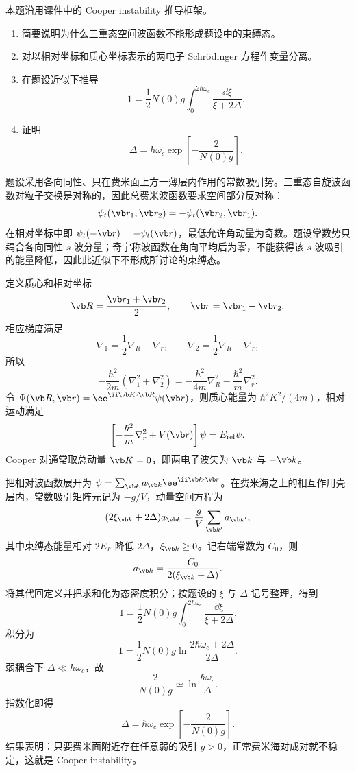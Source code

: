\begin{question}
本题沿用课件中的 Cooper instability 推导框架。
\begin{enumerate}
  \item 简要说明为什么三重态空间波函数不能形成题设中的束缚态。
  \item 对以相对坐标和质心坐标表示的两电子 Schrödinger 方程作变量分离。
  \item 在题设近似下推导
  \[
  1=\frac12N(0)g\int_0^{2\hbar\omega_c}\frac{\dd\xi}{\xi+2\Delta}.
  \]
  \item 证明
  \[
  \Delta=\hbar\omega_c\exp\left[-\frac{2}{N(0)g}\right].
  \]
\end{enumerate}


\begin{solution}
题设采用各向同性、只在费米面上方一薄层内作用的常数吸引势。三重态自旋波函数对粒子交换是对称的，因此总费米波函数要求空间部分反对称：
\[
 \psi_t(\vb r_1,\vb r_2)=-\psi_t(\vb r_2,\vb r_1).
\]
在相对坐标中即 $\psi_t(-\vb r)=-\psi_t(\vb r)$，最低允许角动量为奇数。题设常数势只耦合各向同性 $s$ 波分量；奇宇称波函数在角向平均后为零，不能获得该 $s$ 波吸引的能量降低，因此此近似下不形成所讨论的束缚态。

定义质心和相对坐标
\[
 \vb R=\frac{\vb r_1+\vb r_2}{2},\qquad
 \vb r=\vb r_1-\vb r_2.
\]
相应梯度满足
\[
 \nabla_1=\frac12\nabla_R+\nabla_r,
 \qquad
 \nabla_2=\frac12\nabla_R-\nabla_r,
\]
所以
\[
 -\frac{\hbar^2}{2m}(\nabla_1^2+\nabla_2^2)
 =-\frac{\hbar^2}{4m}\nabla_R^2-
 \frac{\hbar^2}{m}\nabla_r^2.
\]
令
$\Psi(\vb R,\vb r)=\ee^{\ii\vb K\cdot\vb R}\psi(\vb r)$，则质心能量为 $\hbar^2K^2/(4m)$，相对运动满足
\[
 \left[-\frac{\hbar^2}{m}\nabla_r^2+V(\vb r)\right]\psi
 =E_{\rm rel}\psi.
\]
Cooper 对通常取总动量 $\vb K=0$，即两电子波矢为 $\vb k$ 与 $-\vb k$。

把相对波函数展开为
$\psi=\sum_{\vb k}a_{\vb k}\ee^{\ii\vb k\cdot\vb r}$。在费米海之上的相互作用壳层内，常数吸引矩阵元记为 $-g/V$，动量空间方程为
\[
 (2\xi_{\vb k}+2\Delta)a_{\vb k}
 =\frac gV\sum_{\vb k'}a_{\vb k'},
\]
其中束缚态能量相对 $2E_F$ 降低 $2\Delta$，$\xi_{\vb k}\ge0$。记右端常数为 $C_0$，则
\[
 a_{\vb k}=\frac{C_0}{2(\xi_{\vb k}+\Delta)}.
\]
将其代回定义并把求和化为态密度积分；按题设的 $\xi$ 与 $\Delta$ 记号整理，得到
\[
 \boxed{1=\frac12N(0)g
 \int_0^{2\hbar\omega_c}\frac{\dd\xi}{\xi+2\Delta}.}
\]
积分为
\[
 1=\frac12N(0)g
 \ln\frac{2\hbar\omega_c+2\Delta}{2\Delta}.
\]
弱耦合下 $\Delta\ll\hbar\omega_c$，故
\[
 \frac{2}{N(0)g}
 \simeq\ln\frac{\hbar\omega_c}{\Delta}.
\]
指数化即得
\[
 \boxed{\Delta=\hbar\omega_c
 \exp\left[-\frac{2}{N(0)g}\right].}
\]
结果表明：只要费米面附近存在任意弱的吸引 $g>0$，正常费米海对成对就不稳定，这就是 Cooper instability。
\end{solution}
\end{question}
